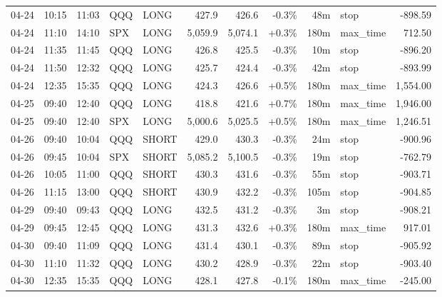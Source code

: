 \documentclass[11pt,a4paper,twoside]{article}
\begin{document}
\begin{center}
\begin{longtable}{>{\color{txtmain}}l l l l l r r r r >{\color{txtmain}}l r}
04-24 & 10:15 & 11:03 & QQQ & LONG & 427.9 & 426.6 & \textcolor{lossred}{-0.3\%} & 48m & stop & \textcolor{lossred}{-898.59} \\
04-24 & 11:10 & 14:10 & SPX & LONG & 5,059.9 & 5,074.1 & \textcolor{wingreen}{+0.3\%} & 180m & max\_time & \textcolor{wingreen}{712.50} \\
04-24 & 11:35 & 11:45 & QQQ & LONG & 426.8 & 425.5 & \textcolor{lossred}{-0.3\%} & 10m & stop & \textcolor{lossred}{-896.20} \\
04-24 & 11:50 & 12:32 & QQQ & LONG & 425.7 & 424.4 & \textcolor{lossred}{-0.3\%} & 42m & stop & \textcolor{lossred}{-893.99} \\
04-24 & 12:35 & 15:35 & QQQ & LONG & 424.3 & 426.6 & \textcolor{wingreen}{+0.5\%} & 180m & max\_time & \textcolor{wingreen}{1,554.00} \\
04-25 & 09:40 & 12:40 & QQQ & LONG & 418.8 & 421.6 & \textcolor{wingreen}{+0.7\%} & 180m & max\_time & \textcolor{wingreen}{1,946.00} \\
04-25 & 09:40 & 12:40 & SPX & LONG & 5,000.6 & 5,025.5 & \textcolor{wingreen}{+0.5\%} & 180m & max\_time & \textcolor{wingreen}{1,246.51} \\
04-26 & 09:40 & 10:04 & QQQ & SHORT & 429.0 & 430.3 & \textcolor{lossred}{-0.3\%} & 24m & stop & \textcolor{lossred}{-900.96} \\
04-26 & 09:45 & 10:04 & SPX & SHORT & 5,085.2 & 5,100.5 & \textcolor{lossred}{-0.3\%} & 19m & stop & \textcolor{lossred}{-762.79} \\
04-26 & 10:05 & 11:00 & QQQ & SHORT & 430.3 & 431.6 & \textcolor{lossred}{-0.3\%} & 55m & stop & \textcolor{lossred}{-903.71} \\
04-26 & 11:15 & 13:00 & QQQ & SHORT & 430.9 & 432.2 & \textcolor{lossred}{-0.3\%} & 105m & stop & \textcolor{lossred}{-904.85} \\
04-29 & 09:40 & 09:43 & QQQ & LONG & 432.5 & 431.2 & \textcolor{lossred}{-0.3\%} & 3m & stop & \textcolor{lossred}{-908.21} \\
04-29 & 09:45 & 12:45 & QQQ & LONG & 431.3 & 432.6 & \textcolor{wingreen}{+0.3\%} & 180m & max\_time & \textcolor{wingreen}{917.01} \\
04-30 & 09:40 & 11:09 & QQQ & LONG & 431.4 & 430.1 & \textcolor{lossred}{-0.3\%} & 89m & stop & \textcolor{lossred}{-905.92} \\
04-30 & 11:10 & 11:32 & QQQ & LONG & 430.2 & 428.9 & \textcolor{lossred}{-0.3\%} & 22m & stop & \textcolor{lossred}{-903.40} \\
04-30 & 12:35 & 15:35 & QQQ & LONG & 428.1 & 427.8 & \textcolor{lossred}{-0.1\%} & 180m & max\_time & \textcolor{lossred}{-245.00} \\

\end{longtable}
\end{center}
\end{document}
